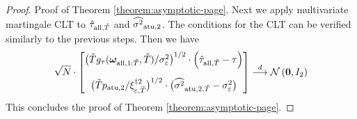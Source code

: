 \begin{proof}{Proof of Theorem \ref{theorem:asymptotic-page}.}
Next we apply multivariate martingale CLT to $\hat{\tau}_{\mathrm{all},\tilde T}$ and $\widehat{\sigma^2}_{\mathrm{atu},2}$. The conditions for the CLT can be verified similarly to the previous steps. Then we have  
\begin{align}
        \sqrt{N} \cdot \begin{bmatrix}
    \big(\tilde{T}\funfrac(\bm{\omega}_{\all,1:\tilde{T}},\tilde{T})/\sigma_\varepsilon^2\big)^{1/2} \cdot \left( \hat{\tau}_{\all,\tilde{T}} - \tau\right) \vspace{0.3cm}  \\ \big(\tilde{T} p_{\ad,2}/\xi^{\dagger 2}_{\varepsilon,\tilde{T}} \big)^{1/2} \cdot \big(\estsigmasq_{\ad,2,\tilde{T}} - \sigma_\varepsilon^2 \big)
        \end{bmatrix}
        \stackrel{d}{\longrightarrow } \mathcal{N} \left(\bm{0}, I_2 \right)
    \end{align}
This concludes the proof of Theorem \ref{theorem:asymptotic-page}. \halmos


\end{proof}
